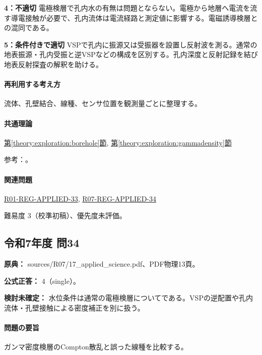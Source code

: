 \noindent\textbf{4：不適切} 電極検層で孔内水の有無は問題とならない。電極から地層へ電流を流す導電接触が必要で、孔内流体は電流経路と測定値に影響する。電磁誘導検層との混同である。\par

\noindent\textbf{5：条件付きで適切} VSPで孔内に振源又は受振器を設置し反射波を測る。通常の地表振源・孔内受振と逆VSPなどの構成を区別する。孔内深度と反射記録を結び地表反射探査の解釈を助ける。\par

\paragraph{再利用する考え方} 流体、孔壁結合、線種、センサ位置を観測量ごとに整理する。

\paragraph{共通理論} \hyperref[theory:exploration:borehole]{第\ref*{theory:exploration:borehole}節}, \hyperref[theory:exploration:gammadensity]{第\ref*{theory:exploration:gammadensity}節}

\par 参考：\cite{epa_borehole_resistivity,epa_gamma_density,geebec_ps,oyo_suspension}。

\paragraph{関連問題} \hyperref[q:r01-reg-applied-33]{R01-REG-APPLIED-33}, \hyperref[q:r07-reg-applied-34]{R07-REG-APPLIED-34}

\par 難易度 3（校準初稿）、優先度未評価。

\subsection{令和7年度 問34}
\label{q:r07-reg-applied-34}

\noindent\textbf{原典：} sources/R07/17\_applied\_science.pdf、PDF物理13頁。

\textbf{公式正答：} 4（single）。

\par\textbf{検討未確定：} 水位条件は通常の電極検層についてである。VSPの逆配置や孔内流体・孔壁接触による密度補正を別に扱う。

\paragraph{問題の要旨} ガンマ密度検層のCompton散乱と誤った線種を比較する。

